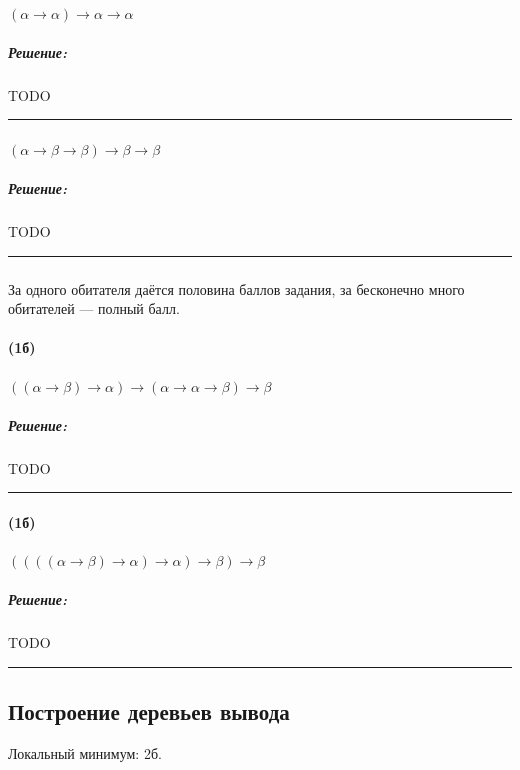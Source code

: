 \documentclass{article}
\newenvironment{proof}{\subparagraph{\hspace{-1em}Решение:\newline}}{\par\noindent\rule{\textwidth}{0.4pt}}
\begin{document}
    \paragraph{} $(\alpha \to \alpha) \to \alpha \to \alpha$

    \begin{proof}
        TODO %
    \end{proof}

    \paragraph{} $(\alpha \to \beta \to \beta) \to \beta \to \beta$

    \begin{proof}
        TODO %
    \end{proof}

    \subsubsection{}

    За одного обитателя даётся половина баллов задания, за бесконечно много обитателей --- полный балл.

    \paragraph{(1б)} $((\alpha \to \beta) \to \alpha) \to (\alpha \to \alpha \to \beta) \to \beta$

    \begin{proof}
        TODO %
    \end{proof}

    \paragraph{(1б)} $((((\alpha \to \beta) \to \alpha) \to \alpha) \to \beta) \to \beta$

    \begin{proof}
        TODO %
    \end{proof}

    \subsection{Построение деревьев вывода}

    Локальный минимум: 2б.
\end{document}
